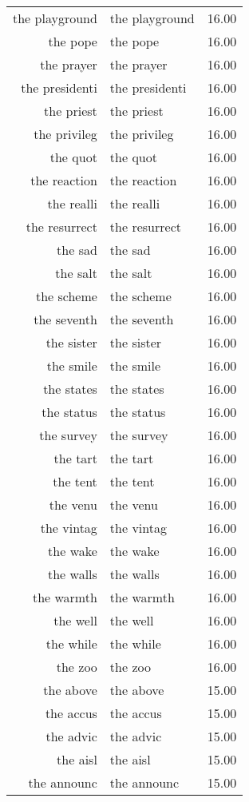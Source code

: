 \begin{table}[ht]
\begin{tabular}{rlr}
  the playground & the playground & 16.00 \\ 
  the pope & the pope & 16.00 \\ 
  the prayer & the prayer & 16.00 \\ 
  the presidenti & the presidenti & 16.00 \\ 
  the priest & the priest & 16.00 \\ 
  the privileg & the privileg & 16.00 \\ 
  the quot & the quot & 16.00 \\ 
  the reaction & the reaction & 16.00 \\ 
  the realli & the realli & 16.00 \\ 
  the resurrect & the resurrect & 16.00 \\ 
  the sad & the sad & 16.00 \\ 
  the salt & the salt & 16.00 \\ 
  the scheme & the scheme & 16.00 \\ 
  the seventh & the seventh & 16.00 \\ 
  the sister & the sister & 16.00 \\ 
  the smile & the smile & 16.00 \\ 
  the states & the states & 16.00 \\ 
  the status & the status & 16.00 \\ 
  the survey & the survey & 16.00 \\ 
  the tart & the tart & 16.00 \\ 
  the tent & the tent & 16.00 \\ 
  the venu & the venu & 16.00 \\ 
  the vintag & the vintag & 16.00 \\ 
  the wake & the wake & 16.00 \\ 
  the walls & the walls & 16.00 \\ 
  the warmth & the warmth & 16.00 \\ 
  the well & the well & 16.00 \\ 
  the while & the while & 16.00 \\ 
  the zoo & the zoo & 16.00 \\ 
  the above & the above & 15.00 \\ 
  the accus & the accus & 15.00 \\ 
  the advic & the advic & 15.00 \\ 
  the aisl & the aisl & 15.00 \\ 
  the announc & the announc & 15.00 \\ 

\end{tabular}
\end{table}
